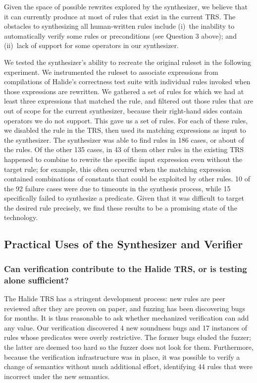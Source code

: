 \documentclass[acmsmall]{acmart}\settopmatter{}
\newcommand{\NumRulesFixed}{{\color{black} 4}\xspace}
\newcommand{\NumPredicatesRelaxed}{{\color{black} 17}\xspace}
\begin{document}
Given the space of possible rewrites explored by the synthesizer, we believe that it can currently produce at most \PercentPossibleToSynth{} of rules that exist in the current TRS. The obstacles to synthesizing all human-written rules include (i)~the inability to automatically verify some rules or preconditions (see Question 3 above); and (ii)~lack of support for some operators in our synthesizer. 

We tested the synthesizer's ability to recreate the original ruleset in the following experiment. We instrumented the ruleset to associate expressions from compilations of Halide's correctness test suite with individual rules invoked when those expressions are rewritten. We gathered a set of rules for which we had at least three expressions that matched the rule, and filtered out those rules that are out of scope for the current synthesizer, because their right-hand sides contain operators we do not support. This gave us a set of \NumRulesInCorrectnessExperiment{} rules. For each of these rules, we disabled the rule in the TRS, then used its matching expressions as input to the synthesizer. The synthesizer was able to find rules in 186 cases, or about \PercentRulesResynthesized{} of the rules. Of the other 135 cases, in 43 of them other rules in the existing TRS happened to combine to rewrite the specific input expression even without the target rule; for example, this often occurred when the matching expression contained combinations of constants that could be exploited by other rules. 10 of the 92 failure cases were due to timeouts in the synthesis process, while 15 specifically failed to synthesize a predicate. Given that it was difficult to target the desired rule precisely, we find these results to be a promising state of the technology.


\subsection{Practical Uses of the Synthesizer and Verifier}

\subsubsection{Can verification contribute to the Halide TRS, or is testing alone sufficient?}
\label{sec:eval-correctness}

The Halide TRS has a stringent development process: new rules are peer reviewed after they are proven on paper, and fuzzing has been discovering bugs for months. It is thus reasonable to ask whether mechanized verification can add any value. Our verification discovered \NumRulesFixed new soundness bugs and \NumPredicatesRelaxed instances of rules whose predicates were overly restrictive. The former bugs eluded the fuzzer; the latter are deemed too hard so the fuzzer does not look for them. Furthermore, because the verification infrastructure was in place, it was possible to verify a change of semantics without much additional effort, identifying 44 rules that were incorrect under the new semantics.
\end{document}
